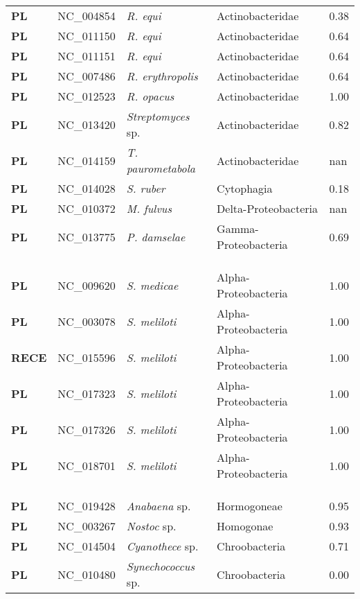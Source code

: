 \begin{adjustwidth}{-3cm}{2cm}
{\begin{supertabular}{>{\bfseries}l|p{0.1\textwidth}p{0.14\textwidth}l|l}
PL & NC\_004854 & \textit{R. equi} & Actinobacteridae & 0.38\\
PL & NC\_011150 & \textit{R. equi} & Actinobacteridae & 0.64\\
PL & NC\_011151 & \textit{R. equi} & Actinobacteridae & 0.64\\
PL & NC\_007486 & \textit{R. erythropolis} & Actinobacteridae & 0.64\\
PL & NC\_012523 & \textit{R. opacus} & Actinobacteridae & 1.00\\
PL & NC\_013420 & \textit{Streptomyces} sp. & Actinobacteridae & 0.82\\
PL & NC\_014159 & \textit{T. paurometabola} & Actinobacteridae & nan\\
PL & NC\_014028 & \textit{S. ruber} & Cytophagia & 0.18\\
PL & NC\_010372 & \textit{M. fulvus }& Delta-Proteobacteria & nan\\
PL & NC\_013775 & \textit{P. damselae} & Gamma-Proteobacteria & 0.69\\
\\
\\
\hline\\
PL & NC\_009620 & \textit{S. medicae} & Alpha-Proteobacteria & 1.00\\
PL & NC\_003078 & \textit{S. meliloti} & Alpha-Proteobacteria & 1.00\\
RECE & NC\_015596 & \textit{S. meliloti} & Alpha-Proteobacteria & 1.00\\
PL & NC\_017323 & \textit{S. meliloti} & Alpha-Proteobacteria & 1.00\\
PL & NC\_017326 & \textit{S. meliloti} & Alpha-Proteobacteria & 1.00\\
PL & NC\_018701 & \textit{S. meliloti} & Alpha-Proteobacteria & 1.00\\
\\
\\
\hline\\
PL & NC\_019428 & \textit{Anabaena} sp. & Hormogoneae & 0.95\\
PL & NC\_003267 & \textit{Nostoc} sp. & Homogonae & 0.93\\
PL & NC\_014504 & \textit{Cyanothece} sp. & Chroobacteria & 0.71\\
PL & NC\_010480 & \textit{Synechococcus} sp. & Chroobacteria & 0.00\\

\end{supertabular}}
\end{adjustwidth}
